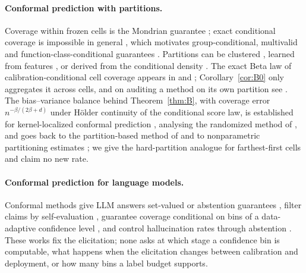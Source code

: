 \documentclass[11pt]{article}
\theoremstyle{definition}
\theoremstyle{remark}
\newcommand{\1}{\mathbf{1}}
\begin{document}
\paragraph{Conformal prediction with partitions.} Coverage within frozen cells is the Mondrian
guarantee \citep{vovk2005algorithmic,vovk2012conditional}; exact conditional coverage is impossible in
general \citep{barber2021limits}, which motivates group-conditional, multivalid and
function-class-conditional guarantees \citep{jung2023batch,bastani2022practical,gibbs2023conformal}.
Partitions can be clustered \citep{ding2023class}, learned from features
\citep{kiyani2024conformal}, or derived from the conditional density \citep{izbicki2022cdsplit}. The
exact Beta law of calibration-conditional cell coverage appears in \citet{vovk2012conditional} and
\citet{ding2023class}; Corollary~\ref{cor:B0} only aggregates it across cells, and on auditing a
method on its own partition see \citet{berthier2026self}. The bias--variance balance behind
Theorem~\ref{thm:B}, with coverage error $n^{-\beta/(2\beta+d)}$ under H\"older continuity of the
conditional score law, is established for kernel-localized conformal prediction
\citep{conrad2026beyond,min2026unified}, analysing the randomized method of \citet{hore2025conformal}, and goes back to the partition-based method
of \citet{lei2014distribution} and to nonparametric partitioning estimates \citep{gyorfi2002distribution};
we give the hard-partition analogue for farthest-first cells \citep{gonzalez1985clustering,dasgupta2005performance}
and claim no new rate.

\paragraph{Conformal prediction for language models.} Conformal methods give LLM answers set-valued or
abstention guarantees \citep{kumar2023conformal,quach2024conformal}, filter claims by self-evaluation
\citep{mohri2024language}, guarantee coverage conditional on bins of a data-adaptive confidence level
\citep{cherian2024large}, and control hallucination rates through abstention
\citep{abbasiyadkori2024mitigating}. These works fix the elicitation; none asks at which stage a
confidence bin is computable, what happens when the elicitation changes between calibration and
deployment, or how many bins a label budget supports.
\end{document}

